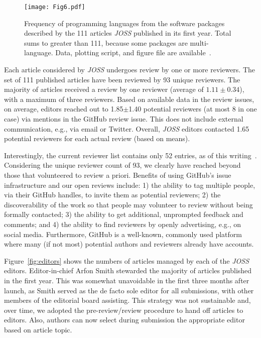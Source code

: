 \documentclass{article}
\newcommand\joss{\textit{JOSS}}
\begin{document}
\begin{figure}[htbp]
    \centering
    \texttt{[image: Fig6.pdf]}
    \caption{Frequency of programming languages from the software packages
    described by the 111 articles \joss{} published in its first year.
    Total sums to greater than 111, because some packages are multi-language. Data, plotting script, and figure file are available~\cite{JOSS-data-figs}.
    }
    \label{fig:programming_languages}
\end{figure}

Each article considered by \joss{} undergoes review by one
or more reviewers. The set of 111 published articles have been
reviewed by 93 unique reviewers.
The majority of articles received a review by
one reviewer (average of $1.11\pm 0.34$), with a maximum of
three reviewers.
Based on available data in the review issues, on average, editors reached out
to 1.85$\pm$1.40 potential reviewers (at most 8 in one case) via mentions
in the GitHub review issue. This does not include external communication,
e.g., via email or Twitter. Overall, \joss{} editors contacted 1.65
potential reviewers for each actual review (based on means).

Interestingly, the current reviewer list contains only 52 entries, as of
this writing~\cite{JOSS-reviewers}. Considering the unique reviewer count of 93,
we clearly have reached beyond those that volunteered to review a priori.
Benefits of using GitHub's issue infrastructure and our open reviews include:
1) the ability to tag multiple people, via their GitHub handles, to invite them as potential reviewers;
2) the discoverability of the work so that people may volunteer to review without being formally contacted;
3) the ability to get additional, unprompted feedback and comments; and
4) the ability to find reviewers by openly advertising, e.g., on social media.
Furthermore, GitHub is a well-known, commonly used platform where many (if not most) potential authors and reviewers already have accounts.

Figure~\ref{fig:editors} shows the numbers of articles managed by each of the
\joss{} editors.
Editor-in-chief Arfon Smith stewarded
the majority of articles published in the
first year. This was somewhat unavoidable
in the first three months after launch, as
Smith served as the de facto sole editor for all submissions, with other members of the editorial
board assisting.
This strategy was not sustainable and, over time, we adopted the pre-review\slash review procedure to hand off articles to editors.
Also, authors can now select during submission the appropriate editor based on article topic.
\end{document}

